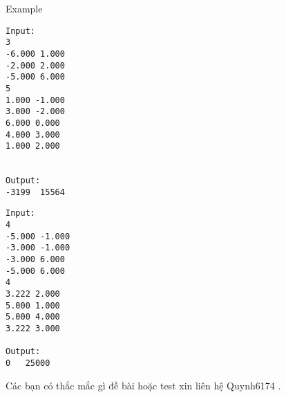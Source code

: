 Example
\begin{verbatim}
Input:
3
-6.000 1.000
-2.000 2.000
-5.000 6.000
5
1.000 -1.000
3.000 -2.000
6.000 0.000
4.000 3.000
1.000 2.000


Output:
-3199  15564
\end{verbatim}
\begin{verbatim}
Input:
4
-5.000 -1.000
-3.000 -1.000
-3.000 6.000
-5.000 6.000
4
3.222 2.000
5.000 1.000
5.000 4.000
3.222 3.000

Output:
0   25000
\end{verbatim}

       Các bạn có thắc mắc gì đề bài hoặc test xin liên hệ Quynh6174 .